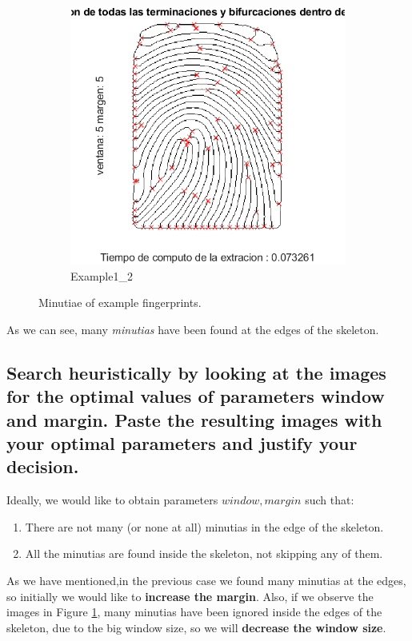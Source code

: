 \documentclass[a4paper]{article}
\begin{document}
\begin{figure}[H]
\begin{subfigure}[t]{0.45\textwidth}
         \includegraphics[scale=0.6]{Figures/Minutiae2}
         \caption{Example1\_2}
     \end{subfigure}
    \caption{Minutiae of example fingerprints.}
    \label{fig:ex5a2}
\end{figure}

As we can see, many \emph{minutias} have been found at the edges of the skeleton.


\subsection{Search heuristically by looking at the images for the optimal values of parameters window and margin. Paste the resulting images with your optimal parameters and justify your decision.}

Ideally, we would like to obtain parameters \(window,margin\) such that:
\begin{enumerate}
\item There are not many (or none at all) minutias in the edge of the skeleton.
\item All the minutias are found inside the skeleton, not skipping any of them.
\end{enumerate}

As we have mentioned,in the previous case we found many minutias at the edges, so initially we would like to \textbf{increase the margin}. Also, if we observe the images in Figure \ref{fig:ex5a2}, many minutias have been ignored inside the edges of the skeleton, due to the big window size, so we will \textbf{decrease the window size}.
\end{document}
